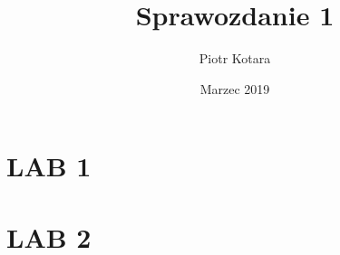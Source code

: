 \documentclass{report}
\title{Sprawozdanie 1}
\author{Piotr Kotara}
\date{Marzec 2019}
\begin{document}
\maketitle

\chapter{LAB 1}



\chapter{LAB 2}


\end{document}
